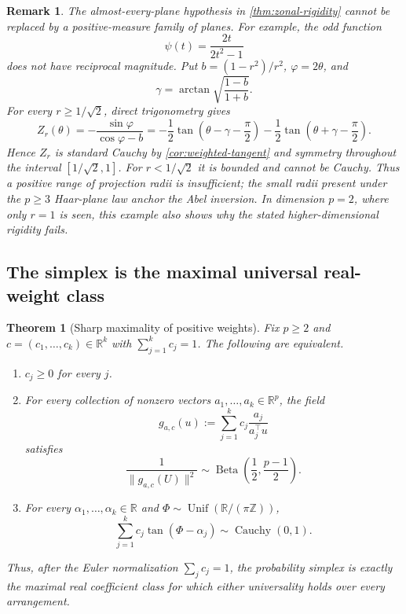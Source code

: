 \documentclass[11pt]{article}
\numberwithin{equation}{section}
\theoremstyle{thmstyleone}%
\newtheorem{theorem}{Theorem}[section]
\theoremstyle{thmstyletwo}%
\newtheorem*{remark}{Remark}%
\let\cref\autoref
\newcommand{\R}{\mathbb R}
\newcommand{\Beta}{\operatorname{Beta}}
\newcommand{\Cauchy}{\operatorname{Cauchy}}
\newcommand{\Unif}{\operatorname{Unif}}
\begin{document}
\begin{remark}
The almost-every-plane hypothesis in \cref{thm:zonal-rigidity} cannot be
replaced by a positive-measure family of planes.  For example, the odd
function
\[
  \psi(t)=\frac{2t}{2t^2-1}
\]
does not have reciprocal magnitude.  Put
\(b=(1-r^2)/r^2\), \(\varphi=2\theta\), and
\[
  \gamma=\arctan\sqrt{\frac{1-b}{1+b}}.
\]
For every \(r\geq1/\sqrt2\), direct trigonometry gives
\[
  Z_r(\theta)
  =-\frac{\sin\varphi}{\cos\varphi-b}
  =-\frac12\tan\!\left(\theta-\gamma-\frac\pi2\right)
   -\frac12\tan\!\left(\theta+\gamma-\frac\pi2\right).
\]
Hence \(Z_r\) is standard Cauchy by \cref{cor:weighted-tangent} and symmetry
throughout the interval \([1/\sqrt2,1]\).  For \(r<1/\sqrt2\) it is bounded and cannot
be Cauchy.  Thus a positive range of projection radii is insufficient; the
small radii present under the \(p\geq3\) Haar-plane law anchor the Abel
inversion.  In dimension \(p=2\), where only \(r=1\) is seen, this example
also shows why the stated higher-dimensional rigidity fails.
\end{remark}

\subsection{The simplex is the maximal universal real-weight class}

\begin{theorem}[Sharp maximality of positive weights]
\label{thm:simplex-maximality}
Fix \(p\geq2\) and \(c=(c_1,\ldots,c_k)\in\R^k\) with
\(\sum_{j=1}^k c_j=1\).  The following are equivalent.
\begin{enumerate}[label=\textup{(\roman*)}]
\item \(c_j\geq0\) for every \(j\).
\item For every collection of nonzero vectors
  \(a_1,\ldots,a_k\in\R^p\), the field
  \[
    g_{a,c}(u):=\sum_{j=1}^k c_j\frac{a_j}{a_j^\top u}
  \]
  satisfies
  \begin{equation}
    \frac{1}{\|g_{a,c}(U)\|^2}
    \sim\Beta\!\left(\frac12,\frac{p-1}{2}\right).
    \label{eq:signed-universal-incidence}
  \end{equation}
\item For every \(\alpha_1,\ldots,\alpha_k\in\R\) and
  \(\Phi\sim\Unif(\R/(\pi\mathbb Z))\),
  \begin{equation}
    \sum_{j=1}^k c_j\tan(\Phi-\alpha_j)
    \sim\Cauchy(0,1).
    \label{eq:signed-universal-tangent}
  \end{equation}
\end{enumerate}
Thus, after the Euler normalization \(\sum_jc_j=1\), the probability simplex
is exactly the maximal real coefficient class for which either universality
holds over every arrangement.
\end{theorem}
\end{document}
